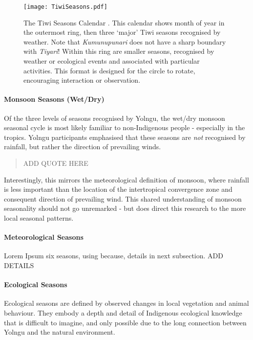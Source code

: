 \begin{landscape}
\begin{figure}[p]
    \centering
    \texttt{[image: TiwiSeasons.pdf]}
    \caption[The Tiwi Seasons Calendar \citep{CSIROcals}]{
        The Tiwi Seasons Calendar \citep{CSIROcals}.
        This calendar shows month of year in the outermost ring,
        then three `major' Tiwi seasons recognised by weather.
        Note that \textit{Kumunupunari} does not have a sharp boundary with \textit{Tiyari}!
        Within this ring are smaller seasons, recognised by weather
        or ecological events and associated with particular activities.
        This format is designed for the circle to rotate, encouraging interaction or observation.
        }
    \label{fig:tiwi-seasons}
\end{figure}
\end{landscape}


\paragraph{Monsoon Seasons (Wet/Dry)}

Of the three levels of seasons recognised by Yolngu,
the wet/dry monsoon seasonal cycle is most likely familiar to non-Indigenous people -
especially in the tropics.  Yolngu participants emphasised that these seasons
are \emph{not} recognised by rainfall, but rather the direction of prevailing winds.

\blockquote{
    ADD QUOTE HERE
}

Interestingly, this mirrors the meteorological definition of monsoon,
where rainfall is less important than the location of the intertropical
convergence zone and consequent direction of prevailing wind.
This shared understanding of monsoon seasonality should not go unremarked -
but does direct this research to the more local seasonal patterns.


\paragraph{Meteorological Seasons}

Lorem Ipsum six seasons, using because, details in next subsection.  ADD DETAILS





\paragraph{Ecological Seasons}
Ecological seasons are defined by observed changes in local vegetation
and animal behaviour.  They embody a depth and detail of Indigenous
ecological knowledge that is difficult to imagine, and only possible
due to the long connection between Yolngu and the natural environment.

